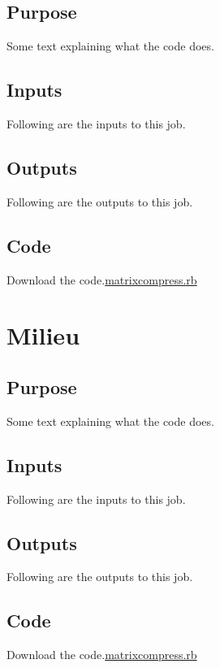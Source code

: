 \documentclass[
  letterpaper,
  DIV=11,
  numbers=noendperiod]{scrreprt}
\begin{document}
\section{Purpose}

Some text explaining what the code does.

\section{Inputs}

Following are the inputs to this job.

\section{Outputs}

Following are the outputs to this job.

\section{Code}

Download the code.\href{../first.rb}{matrixcompress.rb}

\chapter{Milieu}\label{milieu}

\section{Purpose}

Some text explaining what the code does.

\section{Inputs}

Following are the inputs to this job.

\section{Outputs}

Following are the outputs to this job.

\section{Code}

Download the code.\href{../first.rb}{matrixcompress.rb}
\end{document}
